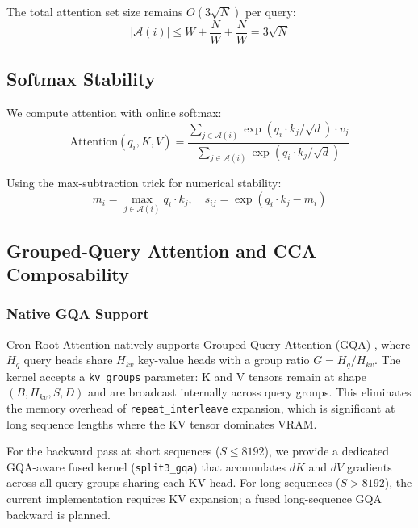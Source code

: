 \documentclass{article}
\begin{document}
    The total attention set size remains $O(3\sqrt{N})$ per query:
    \begin{equation}
    |\mathcal{A}(i)| \leq W + \frac{N}{W} + \frac{N}{W} = 3\sqrt{N}
    \end{equation}

    \subsection{Softmax Stability}

    We compute attention with online softmax:
    \begin{equation}
    \text{Attention}(q_i, K, V) = \frac{\sum_{j \in \mathcal{A}(i)} \exp(q_i \cdot k_j / \sqrt{d}) \cdot v_j}{\sum_{j \in \mathcal{A}(i)} \exp(q_i \cdot k_j / \sqrt{d})}
    \end{equation}

    Using the max-subtraction trick for numerical stability:
    \begin{equation}
    m_i = \max_{j \in \mathcal{A}(i)} q_i \cdot k_j, \quad s_{ij} = \exp(q_i \cdot k_j - m_i)
    \end{equation}

    \subsection{Grouped-Query Attention and CCA Composability}
    \label{sec:gqa_cca}

    \subsubsection{Native GQA Support}

    Cron Root Attention natively supports Grouped-Query Attention (GQA) \cite{gqa}, where $H_q$ query heads share $H_{kv}$ key-value heads with a group ratio $G = H_q / H_{kv}$. The kernel accepts a \texttt{kv\_groups} parameter: K and V tensors remain at shape $(B, H_{kv}, S, D)$ and are broadcast internally across query groups. This eliminates the memory overhead of \texttt{repeat\_interleave} expansion, which is significant at long sequence lengths where the KV tensor dominates VRAM.

    For the backward pass at short sequences ($S \leq 8192$), we provide a dedicated GQA-aware fused kernel (\texttt{split3\_gqa}) that accumulates $dK$ and $dV$ gradients across all query groups sharing each KV head. For long sequences ($S > 8192$), the current implementation requires KV expansion; a fused long-sequence GQA backward is planned.
\end{document}
